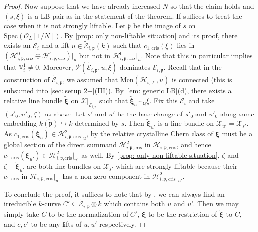 \documentclass[letter, 11pt]{article}
\theoremstyle{plain}
\theoremstyle{definition}
\newcommand{\IQ}{\mathbb{Q}}
\newcommand{\IV}{\mathbb{V}}
\newcommand{\Spec}{\mathrm{Spec}}
\newcommand\tensor{{\otimes}}
\newcommand{\<}{\langle}
\renewcommand{\>}{\rangle}
\newcommand{\into}{\hookrightarrow}
\def\wt{\widetilde}
\newcommand{\fp}{\mathfrak{p}}
\newcommand{\sH}{\mathcal{H}}
\newcommand{\sX}{\mathcal{X}}
\newcommand{\sE}{\mathcal{E}}
\newcommand{\sO}{\mathcal{O}}
\newcommand{\shP}{\mathscr{P}}
\newcommand{\cris}{\mathrm{cris}}
\newcommand{\bxi}{\boldsymbol{\xi}}
\begin{document}
\begin{proof}
    Now suppose that we have already increased $N$ so that the claim holds and $(s, \xi)$ is a LB-pair as in the statement of the theorem. If suffices to treat the case when it is not strongly liftable. Let $\fp$ be the image of $s$ on $\Spec(\sO_L[1/N])$. By \ref{prop: only non-liftable situation} and its proof, there exists an $\sE_i$ and a lift $u \in \wt{\sE}_{i, \fp}(k)$ such that $c_{1, \cris}(\xi)$ lies in $(\sH^0_{i, \fp, \cris} \oplus \sH^1_{i, \fp, \cris})|_{u}$ but not in $\sH^0_{i, \fp, \cris}|_{u}$. Note that this in particular implies that $\IV^1_i \neq 0$. Moreover, $\shP(\wt{\sE}_{i, \fp}, u, \xi)$ dominates $\sE_{i, \fp}$. Recall that in the construction of $\wt{\sE}_{i, \fp}$, we assumed that $\mathrm{Mon}(\sH_{i, \ell}, u)$ is connected (this is subsumed into \ref{sec: setup 2+}(III)). By \ref{lem: generic LB}(d), there exists a relative line bundle $\wt{\bxi}$ on $\sX|_{\wt{\sE}_{i, \fp}}$ such that $\wt{\bxi}_u \sim_\IQ \xi$. Fix this $\sE_i$ and take $(s'_0, u'_0, \zeta)$ as above. Let $s'$ and $u'$ be the base change of $s'_0$ and $u'_0$ along some embedding $\overline{k(\fp)} \into k$ determined by $s$. Then $\wt{\bxi}_{u'}$ is a line bundle on $\sX_{u'} = \sX_{s'}$. As $c_{1, \cris}(\bxi_{u}) \in \sH^2_{i, \fp, \cris}|_{u}$, by \cite[Thm~4.1]{OgusDuke} the relative crystalline Chern class of $\bxi$ must be a global section of the direct summand $\sH^2_{i, \fp, \cris}$ in $\sH_{i, \fp, \cris}$, and hence $c_{1, \cris}(\bxi_{u'}) \in \sH^2_{i, \fp, \cris}|_{u'}$ as well. By \ref{prop: only non-liftable situation}, $\zeta$ and $\zeta - \wt{\bxi}_{u'}$ are both line bundles on $\sX_{s'}$ which are strongly liftable because their $c_{1, \cris}$ in $\sH_{i, \fp, \cris}|_{u'}$ has a non-zero component in $\sH^2_{i, \fp, \cris}|_{u'}$. 
    
    To conclude the proof, it suffices to note that by \cite[Cor.~1.9]{Bertini-irred}, we can always find an irreducible $k$-curve $C' \subseteq \wt{\sE}_{i, \fp} \tensor k$ which contains both $u$ and $u'$. Then we may simply take $C$ to be the normalization of $C'$, $\bxi$ to be the restriction of $\wt{\bxi}$ to $C$, and $c, c'$ to be any lifts of $u, u'$ respectively. 
\end{proof}
\end{document}
